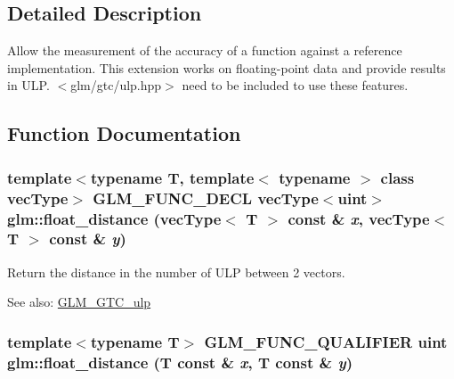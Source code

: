 \subsection{Detailed Description}
Allow the measurement of the accuracy of a function against a reference implementation. This extension works on floating-point data and provide results in ULP. $<$glm/gtc/ulp.hpp$>$ need to be included to use these features. 



\subsection{Function Documentation}
\hypertarget{group__gtc__ulp_g421b0584182815a9e9e64d74361e7409}{
\subsubsection[float\_\-distance]{\setlength{\rightskip}{0pt plus 5cm}template$<$typename T, template$<$ typename $>$ class vecType$>$ GLM\_\-FUNC\_\-DECL vecType$<$uint$>$ glm::float\_\-distance (vecType$<$ T $>$ const \& {\em x}, \/  vecType$<$ T $>$ const \& {\em y})}}
\label{group__gtc__ulp_g421b0584182815a9e9e64d74361e7409}


Return the distance in the number of ULP between 2 vectors. \begin{Desc}
\item[See also:]\hyperlink{group__gtc__ulp}{GLM\_\-GTC\_\-ulp} \end{Desc}
\hypertarget{group__gtc__ulp_g4cb4468c9654077d40266d039158206b}{
\subsubsection[float\_\-distance]{\setlength{\rightskip}{0pt plus 5cm}template$<$typename T$>$ GLM\_\-FUNC\_\-QUALIFIER uint glm::float\_\-distance (T const \& {\em x}, \/  T const \& {\em y})}}
\label{group__gtc__ulp_g4cb4468c9654077d40266d039158206b}


